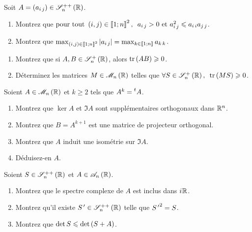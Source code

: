 \begin{exo}
Soit \(A=\paren{a_{i\,j}}\in\symdefpos{n}[\R]\).

\begin{enumerate}
    \item Montrez que \(\quantifs{\tpt\paren{i,j}\in\interventierii{1}{n}^2}a_{i\,j}>0\text{ et }a_{i\,j}^2\leq a_{i\,i}a_{j\,j}\). \\
    \item Montrez que \(\max_{\left(i,j\right)\in\left\llbracket1;n\right\rrbracket^2}\left\lvert a_{i\,j}\right\rvert=\max_{k\in\left\llbracket1;n\right\rrbracket}a_{k\,k}\).
\end{enumerate}
\end{exo}

\begin{exo}
\begin{enumerate}
    \item Montrez que si \(A,B\in\sympos{n}[\R]\), alors \(\operatorname{tr}\left(AB\right)\geqslant0\). \\
    \item Déterminez les matrices \(M\in\M{n}[\R]\) telles que \(\quantifs{\forall S\in\sympos{n}[\R]}\tr\paren{MS}\geq0\).
\end{enumerate}
\end{exo}

\begin{exo}
Soient \(A\in\M{n}[\R]\) et \(k\geq2\) tels que \(A^k=\prescript{t}{}{A}\).

\begin{enumerate}
    \item Montrez que \(\ker A\) et \(\Im A\) sont supplémentaires orthogonaux dans \(\mathbb{R}^n\). \\
    \item Montrez que \(B=A^{k+1}\) est une matrice de projecteur orthogonal. \\
    \item Montrez que \(A\) induit une isométrie sur \(\Im A\). \\
    \item Déduisez-en \(A\).
\end{enumerate}
\end{exo}

\begin{exo}
Soient \(S\in\symdefpos{n}[\R]\) et \(A\in\antisym{n}[\R]\).

\begin{enumerate}
    \item Montrez que le spectre complexe de \(A\) est inclus dans \(i\mkern1mu\mathbb{R}\). \\
    \item Montrez qu'il existe \(S\prim\in\symdefpos{n}[\R]\) telle que \({S^{\,\prime}}^2=S\). \\
    \item Montrez que \(\det S\leqslant\det\left(S+A\right)\).
\end{enumerate}
\end{exo}

